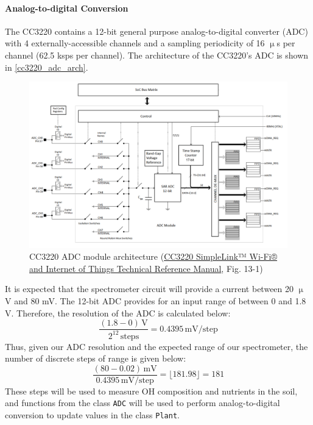 \paragraph{Analog-to-digital Conversion}
The CC3220 contains a 12-bit general purpose analog-to-digital converter
(ADC) with 4 externally-accessible channels and a sampling periodicity of
16 $\upmu$s per channel (62.5 ksps per channel). The architecture of the
CC3220's ADC is shown in \autoref{cc3220_adc_arch}.
\begin{figure}[H]
    \caption{CC3220 ADC module architecture (\href{https://www.ti.com/lit/ug/swru465/swru465.pdf}{CC3220 SimpleLink™ Wi-Fi® and Internet of Things Technical Reference Manual}, Fig. 13-1)}
    \label{cc3220_adc_arch}
    \centering
    \includegraphics[width=\textwidth]{images/cc3220_adc_arch.png}
\end{figure}

It is expected that the spectrometer circuit will provide a current
between 20 $\upmu$V and 80 mV. The 12-bit ADC provides for an input range of
between 0 and 1.8 V. Therefore, the resolution of the ADC is calculated
below:
\begin{equation}
    \label{eq:adc_res}
    \frac{(1.8 - 0)\,\mathrm{V}}{2^{12}\,\mathrm{steps}} =
    0.4395\,\mathrm{mV}/\mathrm{step}
\end{equation}
Thus, given our ADC resolution and the expected range of our spectrometer,
the number of discrete steps of range is given below:
\begin{equation}
    \label{eq:adc_steps}
    \frac{(80 - 0.02)\,\mathrm{mV}}{0.4395\,\mathrm{mV}/\mathrm{step}} =
    \lfloor181.98\rfloor = 181
\end{equation}
These steps will be used to measure OH composition and nutrients in the
soil, and functions from the class \texttt{ADC} will be used to perform
analog-to-digital conversion to update values in the class \texttt{Plant}.

